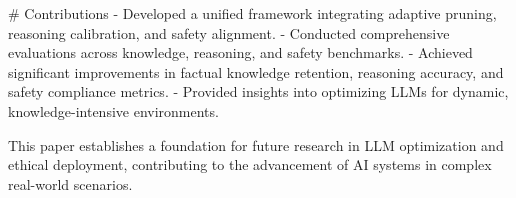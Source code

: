 # Contributions  
- Developed a unified framework integrating adaptive pruning, reasoning calibration, and safety alignment.  
- Conducted comprehensive evaluations across knowledge, reasoning, and safety benchmarks.  
- Achieved significant improvements in factual knowledge retention, reasoning accuracy, and safety compliance metrics.  
- Provided insights into optimizing LLMs for dynamic, knowledge-intensive environments.  

This paper establishes a foundation for future research in LLM optimization and ethical deployment, contributing to the advancement of AI systems in complex real-world scenarios.